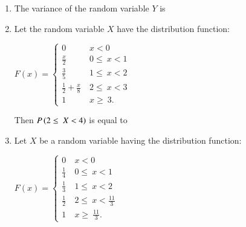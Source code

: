 \documentclass[journal,12pt,twocolumn]{IEEEtran}
\begin{document}
\begin{enumerate}
\begin{enumerate}
\end{enumerate}
\solution

\item The variance of the random variable $Y$ is 
\\
\begin{enumerate}
\end{enumerate}
\solution



\item Let the random variable $X$ have the distribution function: 
\begin{center}
$ 
F(x)=
\begin{cases}
0 &  \ x<0 \\
\frac{x}{2} &  \ 0\leq\ x <1 \\
\frac{3}{5} &  \ 1\leq\ x<2\\
\frac{1}{2}+\frac{x}{8} &  \ 2\leq\ x<3\\
1 &  \ x\geq\ 3.
\end{cases}
$\\ 
\end{center}

Then $P\left(2 \leq\ X<4\right)$ is equal to \underline{\hspace{3cm}}
 \\
\solution


\item Let $X$ be a random variable having the distribution function: 
\begin{center}
$ 
F(x)=
\begin{cases}
0 &  \ x<0 \\
\frac{1}{4} &  \ 0\leq\ x <1 \\
\frac{1}{3} &  \ 1\leq\ x<2\\
\frac{1}{2} &  \ 2\leq\ x<\frac{11}{3}\\
1 &  \ x\geq\ \frac{11}{3}.
\end{cases}
$\\ 
\end{center}


\end{enumerate}
\end{document}
